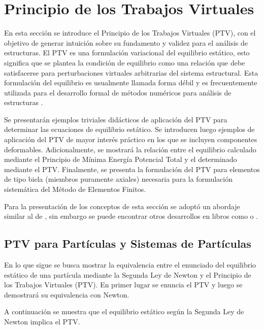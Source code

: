\section{Principio de los Trabajos Virtuales}

En esta sección se introduce el Principio de los Trabajos Virtuales (PTV), con el objetivo de generar intuición sobre su fundamento y validez para el análisis de estructuras. %
%
El PTV es una formulación variacional del equilibrio estático, esto significa que se plantea la condición de equilibrio como una relación que debe satisfacerse para perturbaciones virtuales arbitrarias del sistema estructural. %
%
Esta formulación del equilibrio es usualmente llamada forma débil y es frecuentemente utilizada para el desarrollo formal de métodos numéricos para análisis de estructuras \citep{Hughes1987a}.

Se presentarán ejemplos triviales didácticos de aplicación del PTV para determinar las ecuaciones de equilibrio estático. Se introducen luego ejemplos de aplicación del PTV de mayor interés práctico en los que se incluyen componentes deformables. Adicionalmente, se mostrará la relación entre el equilibrio calculado mediante el Principio de Mínima Energía Potencial Total y el determinado mediante el PTV. Finalmente, se presenta la formulación del PTV para elementos de tipo biela (miembros puramente axiales) necesaria para la formulación sistemática del Método de Elementos Finitos.


Para la presentación de los conceptos de esta sección se adoptó un abordaje similar al de \citep{mcguire1999matrix}, sin embargo se puede encontrar otros desarrollos en libros como \citep{Reddy2002b} o \citep{Bathe2014}.




\subsection{PTV para Partículas y Sistemas de Partículas}

En lo que sigue se busca mostrar la equivalencia entre el enunciado del equilibrio estático de una partícula mediante la Segunda Ley de Newton y el Principio de los Trabajos Virtuales (PTV). En primer lugar se enuncia el PTV y luego se demostrará su equivalencia con Newton.

%
A continuación se muestra que el equilibrio estático según la Segunda Ley de Newton implica el PTV. 

